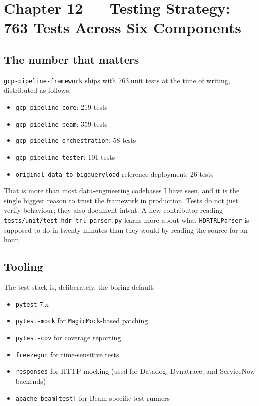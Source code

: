 \documentclass[
  11pt,
  british,
  oneside]{book}
\providecommand{\tightlist}{%
  \setlength{\itemsep}{0pt}\setlength{\parskip}{0pt}}
\begin{document}
\newpage

\hypertarget{chapter-12-testing-strategy-763-tests-across-six-components}{%
\chapter{Chapter 12 --- Testing Strategy: 763 Tests Across Six
Components}\label{chapter-12-testing-strategy-763-tests-across-six-components}}

\hypertarget{the-number-that-matters}{%
\section{The number that matters}\label{the-number-that-matters}}

\texttt{gcp-pipeline-framework} ships with 763 unit tests at the time of
writing, distributed as follows:

\begin{itemize}
\tightlist
\item
  \texttt{gcp-pipeline-core}: 219 tests
\item
  \texttt{gcp-pipeline-beam}: 359 tests
\item
  \texttt{gcp-pipeline-orchestration}: 58 tests
\item
  \texttt{gcp-pipeline-tester}: 101 tests
\item
  \texttt{original-data-to-bigqueryload} reference deployment: 26 tests
\end{itemize}

That is more than most data-engineering codebases I have seen, and it is
the single biggest reason to trust the framework in production. Tests do
not just verify behaviour; they also document intent. A new contributor
reading \texttt{tests/unit/test\_hdr\_trl\_parser.py} learns more about
what \texttt{HDRTRLParser} is supposed to do in twenty minutes than they
would by reading the source for an hour.

\hypertarget{tooling}{%
\section{Tooling}\label{tooling}}

The test stack is, deliberately, the boring default:

\begin{itemize}
\tightlist
\item
  \texttt{pytest} 7.x
\item
  \texttt{pytest-mock} for \texttt{MagicMock}-based patching
\item
  \texttt{pytest-cov} for coverage reporting
\item
  \texttt{freezegun} for time-sensitive tests
\item
  \texttt{responses} for HTTP mocking (used for Datadog, Dynatrace, and
  ServiceNow backends)
\item
  \texttt{apache-beam{[}test{]}} for Beam-specific test runners
\end{itemize}
\end{document}

